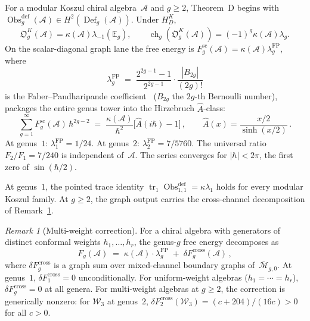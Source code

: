 \documentclass[11pt,reqno]{amsart}
\theoremstyle{definition}
\theoremstyle{remark}
\newtheorem{remark}[theorem]{Remark}
\newcommand{\cA}{\mathcal{A}}
\newcommand{\cM}{\mathcal{M}}
\newcommand{\cW}{\mathcal{W}}
\numberwithin{equation}{section}
\begin{document}
For a modular Koszul chiral algebra~$\cA$ and $g\geq2$, Theorem~D
begins with
$\operatorname{Obs}^{\mathrm{def}}_g(\cA)
\in H^2(\operatorname{Def}_g(\cA))$.  Under $H_D^K$,
\begin{equation}\label{eq:genus-universality}
\mathfrak O_g^K(\cA)=\kappa(\cA)\lambda_{-1}(\mathbb E_g),
\qquad
\operatorname{ch}_g(\mathfrak O_g^K(\cA))
=(-1)^g\kappa(\cA)\lambda_g.
\end{equation}
On the scalar-diagonal graph lane the free energy is
$F_g^{\mathrm{sc}}(\cA)=\kappa(\cA)\lambda_g^{\mathrm{FP}}$, where
\begin{equation}\label{eq:faber-pandharipande}
\lambda_g^{\mathrm{FP}}
\;=\;
\frac{2^{2g-1} - 1}{2^{2g-1}}
\cdot
\frac{|B_{2g}|}{(2g)!}
\end{equation}
is the Faber--Pandharipande coefficient~\cite{FP00} ($B_{2g}$ the
$2g$-th Bernoulli number), packages the entire genus tower
into the Hirzebruch $\hat{A}$-class:
\begin{equation}\label{eq:ahat-generating}
\sum_{g=1}^{\infty}
F_g^{\mathrm{sc}}(\cA)\,\hbar^{2g-2}
\;=\;
\frac{\kappa(\cA)}{\hbar^2}
\bigl[\hat{A}(i\hbar) - 1\bigr]\,,
\qquad
\hat{A}(x) = \frac{x/2}{\sinh(x/2)}\,.
\end{equation}
At genus~$1$: $\lambda_1^{\mathrm{FP}} = 1/24$. At
genus~$2$: $\lambda_2^{\mathrm{FP}} = 7/5760$. The
universal ratio $F_2/F_1 = 7/240$ is independent
of~$\cA$. The series converges for
$|\hbar| < 2\pi$, the first zero of $\sin(\hbar/2)$.

At genus~$1$, the pointed trace identity
$\operatorname{tr}_1\operatorname{Obs}^{\mathrm{def}}_{1,1}
=\kappa\lambda_1$ holds for every modular Koszul family.  At
$g\ge2$, the graph output carries the cross-channel decomposition
of Remark~\ref{rem:multi-weight}.

\begin{remark}[Multi-weight correction]
\label{rem:multi-weight}
For a chiral algebra with generators of distinct conformal
weights $h_1, \ldots, h_r$, the genus-$g$ free energy
decomposes as
\begin{equation}\label{eq:multi-weight-decomposition}
F_g(\cA)
\;=\;
\kappa(\cA) \cdot \lambda_g^{\mathrm{FP}}
\;+\;
\delta F_g^{\mathrm{cross}}(\cA)\,,
\end{equation}
where $\delta F_g^{\mathrm{cross}}$ is a graph sum over
mixed-channel boundary graphs of~$\overline{\cM}_{g,0}$.
At genus~$1$, $\delta F_1^{\mathrm{cross}} = 0$
unconditionally. For uniform-weight algebras
($h_1 = \cdots = h_r$),
$\delta F_g^{\mathrm{cross}} = 0$ at all genera. For
multi-weight algebras at $g \ge 2$, the correction is
generically nonzero: for $\cW_3$ at genus~$2$,
$\delta F_2^{\mathrm{cross}}(\cW_3)
= (c + 204)/(16c) > 0$ for all $c > 0$.
\end{remark}
\end{document}
